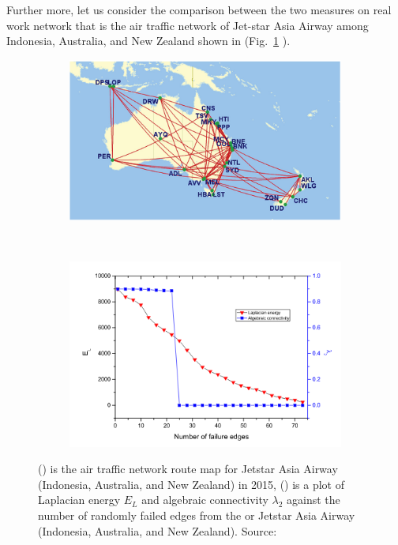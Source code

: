 \documentclass[10pt,a4paper]{article}
\begin{document}
Further more, let us consider the comparison between the two measures on real work network that is the air traffic network of Jet-star Asia Airway among Indonesia, Australia, and New Zealand shown in  (Fig.~\ref{jetstarnetwork} ).
\begin{figure}[H]
	\centering
	\begin{subfigure}[b]{0.45\textwidth}
		\includegraphics[width=\textwidth]{images/jetstar-airnetwork.png}
		\caption{}
		\label{jetstarnetwork}
	\end{subfigure}~
	\begin{subfigure}[b]{0.45\textwidth}
		\includegraphics[width= \textwidth]{images/lapalgebraic.png}
		\caption{}
		\label{connectivitycurve}
	\end{subfigure}
	\caption{() is the air traffic network route map for Jetstar Asia Airway (Indonesia, Australia, and New Zealand) in 2015,  () is a plot of Laplacian energy $E_L$ and algebraic connectivity $\lambda_2$ against the number of randomly failed edges from the or Jetstar Asia Airway (Indonesia, Australia, and New Zealand). Source: \citep{yang2016air} }
	\label{robustness}
\end{figure}
\end{document}
